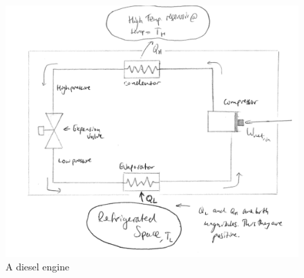 \documentclass[class=report, crop=false, 12pt,a4paper]{standalone}
\begin{document}
\begin{figure}[H]
  \begin{center}
    \includegraphics[width = \textwidth]{../img/RefrigerationCycle}
    \caption{A diesel engine}
  \end{center}
\end{figure}
\end{document}
